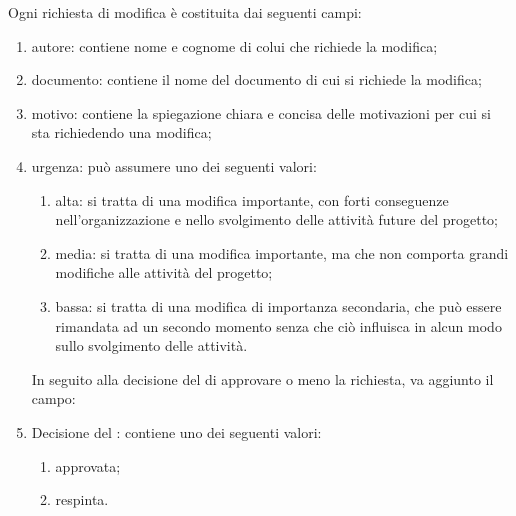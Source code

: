 					Ogni richiesta di modifica è costituita dai seguenti campi:
					\begin{enumerate}
						\item autore: contiene nome e cognome di colui che richiede la modifica;
						\item documento: contiene il nome del documento di cui si richiede la modifica;
						\item motivo: contiene la spiegazione chiara e concisa delle motivazioni per cui si sta richiedendo una modifica;
						\item urgenza: può assumere uno dei seguenti valori:
							\begin{enumerate}
								\item alta: si tratta di una modifica importante, con forti conseguenze nell'organizzazione e nello svolgimento delle attività future del progetto;
								\item media: si tratta di una modifica importante, ma che non comporta grandi modifiche alle attività del progetto;
								\item bassa: si tratta di una modifica di importanza secondaria, che può essere rimandata ad un secondo momento senza che ciò influisca in alcun modo sullo svolgimento delle attività.
							\end{enumerate}
					In seguito alla decisione del  di approvare o meno la richiesta, va aggiunto il campo:
						\item Decisione del : contiene uno dei seguenti valori:
							\begin{enumerate}
								\item approvata;
								\item respinta.
							\end{enumerate}
					\end{enumerate}
					
